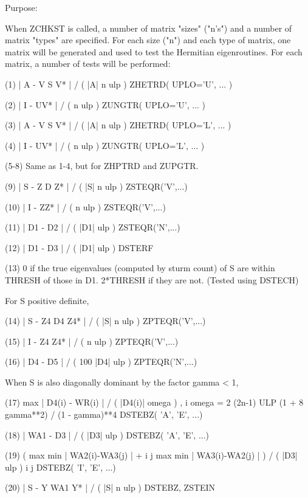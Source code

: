 \begin{DoxyParagraph}{Purpose\+: }
\begin{DoxyVerb}
 When ZCHKST is called, a number of matrix "sizes" ("n's") and a
 number of matrix "types" are specified.  For each size ("n")
 and each type of matrix, one matrix will be generated and used
 to test the Hermitian eigenroutines.  For each matrix, a number
 of tests will be performed:

 (1)     | A - V S V* | / ( |A| n ulp ) ZHETRD( UPLO='U', ... )

 (2)     | I - UV* | / ( n ulp )        ZUNGTR( UPLO='U', ... )

 (3)     | A - V S V* | / ( |A| n ulp ) ZHETRD( UPLO='L', ... )

 (4)     | I - UV* | / ( n ulp )        ZUNGTR( UPLO='L', ... )

 (5-8)   Same as 1-4, but for ZHPTRD and ZUPGTR.

 (9)     | S - Z D Z* | / ( |S| n ulp ) ZSTEQR('V',...)

 (10)    | I - ZZ* | / ( n ulp )        ZSTEQR('V',...)

 (11)    | D1 - D2 | / ( |D1| ulp )        ZSTEQR('N',...)

 (12)    | D1 - D3 | / ( |D1| ulp )        DSTERF

 (13)    0 if the true eigenvalues (computed by sturm count)
         of S are within THRESH of
         those in D1.  2*THRESH if they are not.  (Tested using
         DSTECH)

 For S positive definite,

 (14)    | S - Z4 D4 Z4* | / ( |S| n ulp ) ZPTEQR('V',...)

 (15)    | I - Z4 Z4* | / ( n ulp )        ZPTEQR('V',...)

 (16)    | D4 - D5 | / ( 100 |D4| ulp )       ZPTEQR('N',...)

 When S is also diagonally dominant by the factor gamma < 1,

 (17)    max | D4(i) - WR(i) | / ( |D4(i)| omega ) ,
          i
         omega = 2 (2n-1) ULP (1 + 8 gamma**2) / (1 - gamma)**4
                                              DSTEBZ( 'A', 'E', ...)

 (18)    | WA1 - D3 | / ( |D3| ulp )          DSTEBZ( 'A', 'E', ...)

 (19)    ( max { min | WA2(i)-WA3(j) | } +
            i     j
           max { min | WA3(i)-WA2(j) | } ) / ( |D3| ulp )
            i     j
                                              DSTEBZ( 'I', 'E', ...)

 (20)    | S - Y WA1 Y* | / ( |S| n ulp )  DSTEBZ, ZSTEIN


\end{DoxyVerb}
\end{DoxyParagraph}
